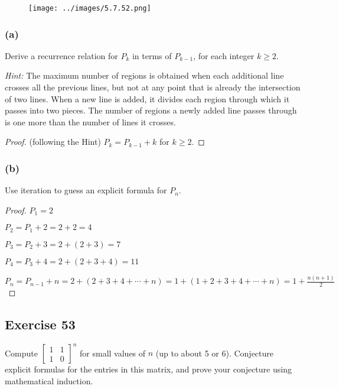 \documentclass[14pt]{extarticle}
\begin{document}
\begin{figure}[ht!]
    \centering
    \texttt{[image: ../images/5.7.52.png]}
\end{figure}

\subsubsection{(a)}
Derive a recurrence relation for $P_k$ in terms of \(P_{k-1}\), for each integer \(k \geq 2\).

    {\it Hint:} The maximum number of regions is obtained when each additional line crosses all the previous lines, but
not at any point that is already the intersection of two lines. When a new line is added, it divides each region
through which it passes into two pieces. The number of regions a newly added line passes through is one more than
the number of lines it crosses.

\begin{proof}
    (following the Hint) \(P_k = P_{k-1} + k\) for \(k \geq 2\).
\end{proof}

\subsubsection{(b)}
Use iteration to guess an explicit formula for $P_n$.

\begin{proof}
    \(P_1 = 2\)

    \(P_2 = P_1 + 2 = 2 + 2 = 4\)

    \(P_3 = P_2 + 3 = 2 + (2 + 3) = 7\)

    \(P_4 = P_3 + 4 = 2 + (2 + 3 + 4) = 11\)

    \(P_n = P_{n-1} + n = 2 + (2 + 3 + 4 + \cdots + n) = 1 + (1 + 2 + 3 + 4 + \cdots + n) = 1 + \frac{n(n+1)}{2}\)
\end{proof}

\subsection{Exercise 53}
Compute \(
\left[
    \begin{array}{cc}
        1 & 1 \\
        1 & 0
    \end{array}
    \right]^n
\) for small values of $n$ (up to about 5 or 6). Conjecture explicit formulas for the entries in this matrix, and prove
your conjecture using mathematical induction.
\end{document}
